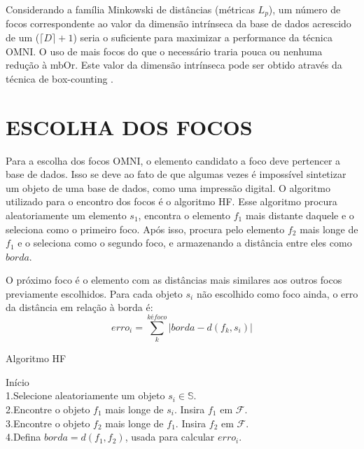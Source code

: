 Considerando a família Minkowski de distâncias (métricas $L_p$), um número de focos correspondente ao valor da
dimensão intrínseca da base de dados acrescido de um ($\lceil D \rceil +1$) seria o suficiente para maximizar a performance da técnica OMNI. O uso de mais focos do que o 
necessário traria pouca ou nenhuma redução à mbOr. Este valor da dimensão intrínseca pode ser obtido através da técnica de box-counting \cite{Block1990}.

\section{ESCOLHA DOS FOCOS}
\label{sec:escoco}
Para a escolha dos focos OMNI, o elemento candidato a foco deve pertencer a base de dados. Isso se deve ao fato de que algumas vezes
é impossível sintetizar um objeto de uma base de dados, como uma impressão digital. O algoritmo utilizado para o encontro dos focos
é o algoritmo HF. Esse algoritmo procura aleatoriamente um elemento $s_1$, encontra o elemento $f_1$ mais distante daquele e o seleciona como
o primeiro foco. Após isso, procura pelo elemento $f_2$ mais longe de $f_1$ e o seleciona como o segundo foco, e armazenando
a distância entre eles como $borda$.\par

O próximo foco é o elemento com as distâncias mais similares aos outros focos previamente escolhidos. Para cada objeto
$s_i$ não escolhido como foco ainda, o erro da distância em relação à borda é:
\begin{equation}
 erro_i = \sum_{k}^{k é foco} |borda - d(f_k, s_i)|
\end{equation}

\begin{algorithm}
\label{alg:hf}
    \caption{Algoritmo HF}
    Início\\
       1.Selecione aleatoriamente um objeto $s_i \in \mathbb{S}$.\\
       2.Encontre o objeto $f_1$ mais longe de $s_i$. Insira $f_1$ em $\mathscr{F}$.\\
       3.Encontre o objeto $f_2$ mais longe de $f_1$. Insira $f_2$ em $\mathscr{F}$.\\
       4.Defina $borda=d(f_1,f_2)$, usada para calcular $erro_i$.\\
\end{algorithm}

